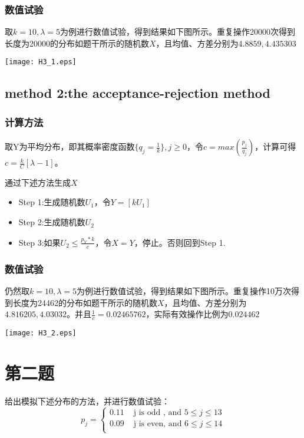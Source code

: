 \documentclass{ctexart}
\begin{document}
\subsubsection{数值试验}

取\(k=10,\lambda = 5\)为例进行数值试验，得到结果如下图所示。重复操作20000次得到长度为20000的分布如题干所示的随机数\(X\)，且均值、方差分别为\(4.8859,4.435303\)

\centerline{\texttt{[image: H3\_1.eps]}}



\subsection{method 2:the acceptance-rejection method}
 \subsubsection{计算方法}
取Y为平均分布，即其概率密度函数\(\{q_j=\frac{1}{k}\},j \geq 0\)，令\(c = max(\frac{p_j}{q_j})\)，计算可得\(c = \frac{k}{C}[\lambda-1]\)。

通过下述方法生成\(X\)
\begin{itemize} 
\item Step 1:生成随机数\(U_1\)，令\(Y=[kU_1]\)
\item Step 2:生成随机数\(U_2\)
\item Step 3:如果\(U_2 \leq \frac{p_Y*k}{c}\)，令\(X=Y\)，停止。否则回到Step 1.
\end{itemize}


\subsubsection{数值试验}

仍然取\(k=10,\lambda = 5\)为例进行数值试验，得到结果如下图所示。重复操作10万次得到长度为24462的分布如题干所示的随机数\(X\)，且均值、方差分别为\(4.816205,4.03032\)。并且\(\frac{1}{c}=0.02465762\)，实际有效操作比例为\(0.024462\)

\centerline{\texttt{[image: H3\_2.eps]}}



\section{第二题}

给出模拟下述分布的方法，并进行数值试验：
\[
p_j = \left\{ \begin{array}{rl}
  0.11 &\mbox{ j is odd , and \(5 \leq j \leq 13\)} \\
  0.09 &\mbox{ j is even, and \(6 \leq j \leq 14\)} \\
     \end{array} \right.
\]
\end{document}
